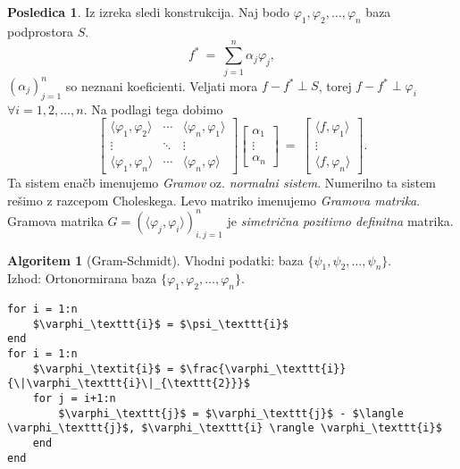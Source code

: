 \documentclass[11pt]{article}
\theoremstyle{definition}
\theoremstyle{definition}
\newtheorem*{algoritem}{Algoritem}
\newtheorem*{posledica}{Posledica}
\begin{document}
\begin{posledica}

Iz izreka sledi konstrukcija. Naj bodo $\varphi_1, \varphi_2, \ldots, \varphi_n$ baza podprostora $S$. 
$$f^* ~=~ \sum_{j=1}^n \alpha_j \varphi_j,$$ 
$(\alpha_j)_{j=1}^n$ so neznani koeficienti. Veljati mora $f - f^* \perp S$, torej $f - f^* \perp \varphi_i$ $\forall i = 1, 2, \ldots, n$. Na podlagi tega dobimo
$$\begin{bmatrix}
\langle \varphi_1, \varphi_2 \rangle & \cdots & \langle \varphi_n, \varphi_1 \rangle \\
\vdots & \ddots & \vdots \\
\langle \varphi_1, \varphi_n \rangle & \cdots & \langle \varphi_n, \varphi \rangle
\end{bmatrix} \begin{bmatrix}
\alpha_1 \\
\vdots \\
\alpha_n
\end{bmatrix} ~=~ \begin{bmatrix}
\langle f, \varphi_1 \rangle \\
\vdots \\
\langle f, \varphi_n \rangle
\end{bmatrix}.$$
Ta sistem enačb imenujemo \textit{Gramov} oz. \textit{normalni sistem}. Numerilno ta sistem rešimo z razcepom Choleskega. Levo matriko imenujemo \textit{Gramova matrika}. Gramova matrika $G = (\langle \varphi_j, \varphi_i \rangle)_{i,j=1}^n$ je \textit{simetrična pozitivno definitna} matrika.

\end{posledica}
\vspace{0.5cm}

\pagebreak

\begin{algoritem}[Gram-Schmidt]

Vhodni podatki: baza $\{\psi_1, \psi_2, \ldots, \psi_n\}$. \\
Izhod: Ortonormirana baza $\{\varphi_1, \varphi_2, \ldots, \varphi_n\}$.
\begin{lstlisting}
for i = 1:n
	$\varphi_\texttt{i}$ = $\psi_\texttt{i}$
end
for i = 1:n
	$\varphi_\textit{i}$ = $\frac{\varphi_\texttt{i}}{\|\varphi_\texttt{i}\|_{\texttt{2}}}$
	for j = i+1:n
		$\varphi_\texttt{j}$ = $\varphi_\texttt{j}$ - $\langle \varphi_\texttt{j}$, $\varphi_\texttt{i} \rangle \varphi_\texttt{i}$
	end
end
\end{lstlisting}

\end{algoritem}
\vspace{0.5cm}
\end{document}
